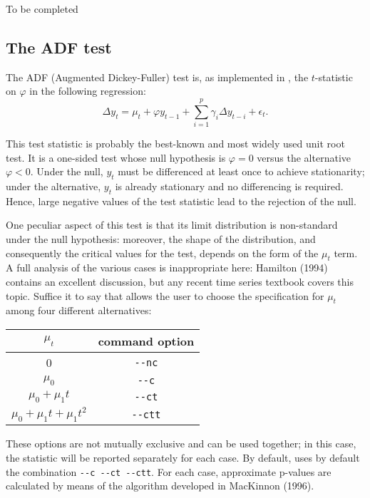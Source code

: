 To be completed

\subsection{The ADF test}
\label{sec:ADFtest}

The ADF (Augmented Dickey-Fuller) test is, as implemented in
, the $t$-statistic on $\varphi$ in the following regression:
\begin{equation}
  \label{eq:ADFtest}
  \Delta y_t = \mu_t + \varphi y_{t-1} + \sum_{i=1}^p \gamma_i \Delta
  y_{t-i} + \epsilon_t .
\end{equation}

This test statistic is probably the best-known and most widely used
unit root test. It is a one-sided test whose null hypothesis is
$\varphi = 0$ versus the alternative $\varphi < 0$. Under the null,
$y_t$ must be differenced at least once to achieve stationarity;
under the alternative, $y_t$ is already stationary and no differencing
is required. Hence, large negative values of the test statistic lead
to the rejection of the null.

One peculiar aspect of this test is that its limit distribution is
non-standard under the null hypothesis: moreover, the shape of the
distribution, and consequently the critical values for the test,
depends on the form of the $\mu_t$ term.  A full analysis of the
various cases is inappropriate here: Hamilton (1994) contains an
excellent discussion, but any recent time series textbook covers
this topic. Suffice it to say that  allows the user to
choose the specification for $\mu_t$ among four different
alternatives:

\begin{center}
  \begin{tabular}{cc}
    \hline
    $\mu_t$ & command option \\
    \hline
    0 & \verb|--nc| \\
    $\mu_0$ &  \verb|--c| \\
    $\mu_0 + \mu_1 t$ &  \verb|--ct| \\
    $\mu_0 + \mu_1 t + \mu_1 t^2$ &  \verb|--ctt| \\
    \hline
  \end{tabular}
\end{center}

These options are not mutually exclusive and can be used together; in
this case, the statistic will be reported separately for each case.
By default,  uses by default the combination
\verb|--c --ct --ctt|. For each case, approximate p-values are
calculated by means of the algorithm developed in MacKinnon (1996).

